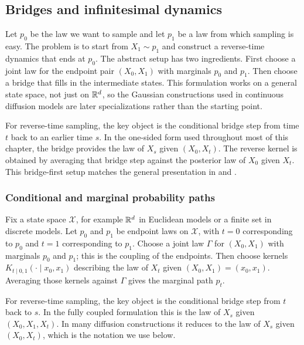 \subsection{Bridges and infinitesimal dynamics}
\label{subsec:diffusion-bridges-dynamics}

Let \(p_0\) be the law we want to sample and let \(p_1\) be a law from which sampling is easy.
The problem is to start from \(X_1\sim p_1\) and construct a reverse-time dynamics that ends at \(p_0\).
The abstract setup has two ingredients.
First choose a joint law for the endpoint pair \((X_0,X_1)\) with marginals \(p_0\) and \(p_1\).
Then choose a bridge that fills in the intermediate states.
This formulation works on a general state space, not just on \(\mathbb{R}^d\), so the Gaussian constructions used in continuous diffusion models are later specializations rather than the starting point.

For reverse-time sampling, the key object is the conditional bridge step from time \(t\) back to an earlier time \(s\).
In the one-sided form used throughout most of this chapter, the bridge provides the law of \(X_s\) given \((X_0,X_t)\).
The reverse kernel is obtained by averaging that bridge step against the posterior law of \(X_0\) given \(X_t\).
This bridge-first setup matches the general presentation in \citet[\S3.1]{holderrieth_erives_2026_intro_flow_matching} and \citet[\S5.3.2]{lai_song_kim_mitsufuji_ermon_2025_principles_diffusion}.

\subsubsection{Conditional and marginal probability paths}
\label{subsubsec:conditional-marginal-probability-paths}

Fix a state space \(\mathcal{X}\), for example \(\mathbb{R}^d\) in Euclidean models or a finite set in discrete models.
Let \(p_0\) and \(p_1\) be endpoint laws on \(\mathcal{X}\), with \(t=0\) corresponding to \(p_0\) and \(t=1\) corresponding to \(p_1\).
Choose a joint law \(\Gamma\) for \((X_0,X_1)\) with marginals \(p_0\) and \(p_1\); this is the coupling of the endpoints.
Then choose kernels \(K_{t\mid 0,1}(\cdot\mid x_0,x_1)\) describing the law of \(X_t\) given \((X_0,X_1)=(x_0,x_1)\).
Averaging those kernels against \(\Gamma\) gives the marginal path \(p_t\).

For reverse-time sampling, the key object is the conditional bridge step from \(t\) back to \(s\).
In the fully coupled formulation this is the law of \(X_s\) given \((X_0,X_1,X_t)\).
In many diffusion constructions it reduces to the law of \(X_s\) given \((X_0,X_t)\), which is the notation we use below.

